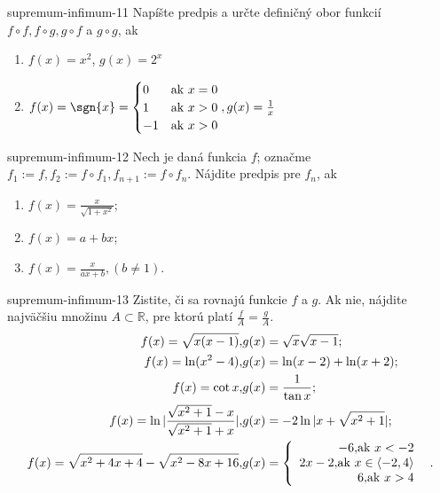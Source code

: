 \begin{defproblem}{supremum-infimum-11}
Napíšte predpis a určte definičný obor funkcií $f \circ f,f \circ g,g \circ f$
a $g \circ g$, ak
\begin{enumerate}
    \item $f(x) = x^2$, $g(x) = 2^x$
    \item $f(x) = \sgn{x} =
        \begin{cases}
            0  & \text{ak } x = 0 \\
            1  & \text{ak } x > 0 \\
            -1 & \text{ak } x > 0
        \end{cases}
        , \hfill g(x)=\frac{1}{x}$
\end{enumerate}
\end{defproblem}

\begin{defproblem}{supremum-infimum-12}
Nech je daná funkcia $f$; označme $f_1:=f,f_2:=f\circ f_1,f_{n+1}:=f\circ f_n$. Nájdite predpis pre $f_n$, ak
\begin{enumerate}
\item $f(x)=\frac{x}{\sqrt{1+x^2}}$;
\item $f(x)=a+bx$;
\item $f(x)=\frac{x}{ax+b},(b\neq 1)$.
\end{enumerate}
\end{defproblem}

\begin{defproblem}{supremum-infimum-13}
Zistite, či sa rovnajú funkcie $f$ a $g$. Ak nie, nájdite najväčšiu množinu $A\subset\mathbb{R}$, pre ktorú platí $\frac{f}{A}=\frac{g}{A}$.
\begin{align*}
f(x)=\sqrt{x(x-1)}, & g(x)=\sqrt{x}\sqrt{x-1};\\
f(x)=\ln (x^2-4), & g(x)=\ln (x-2)+\ln (x+2);\\
f(x)=\cot x, & g(x)=\frac{1}{\tan x};\\
f(x)=\ln |\frac{\sqrt{x^2+1}-x}{\sqrt{x^2+1}+x}|, & g(x)=-2\ln |x+\sqrt{x^2+1}|;\\
f(x)=\sqrt{x^2+4x+4}-\sqrt{x^2-8x+16}, & g(x)= \left\{ \begin{array}{r@{\quad}c}
    -6, $ak $ x<-2 \\
    2x-2, $ak $ x\in\langle -2,4 \rangle \\
   6, $ak $ x>4 \\ \end{array} \right. .
\end{align*}
\end{defproblem}

